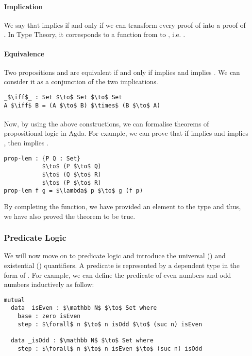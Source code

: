 \paragraph{Implication} We say that  implies  if and only if we can
transform every proof of  into a proof of . In Type
Theory, it corresponds to a function from  to , i.e. . 

\paragraph{Equivalence} Two propositions  and
 are equivalent if and only if  implies  and  implies
. We can consider it as a conjunction of the two implications.
\begin{lstlisting}[mathescape=true,xleftmargin=.3\textwidth]
_$\iff$_ : Set $\to$ Set $\to$ Set
A $\iff$ B = (A $\to$ B) $\times$ (B $\to$ A)
\end{lstlisting} 

\paragraph{} Now, by using the above constructions, we can formalise
 theorems of propositional logic in Agda. For example, we can prove that if  implies  and
 implies , then  implies . 
\begin{lstlisting}[mathescape=true,xleftmargin=.3\textwidth]
prop-lem : {P Q : Set} 
           $\to$ (P $\to$ Q) 
           $\to$ (Q $\to$ R) 
           $\to$ (P $\to$ R)
prop-lem f g = $\lambda$ p $\to$ g (f p)
\end{lstlisting} 

\par By completing the function, we have provided an element
to the type  and thus, we have
also proved the theorem to be true. 


\subsubsection{Predicate Logic} 
\par We will now move on to predicate logic and
introduce the universal (\mb{\forall}) and existential (\mb{\exists})
quantifiers. A predicate is represented by a dependent type in the
form of . For example, we can
define the predicate of even numbers and odd numbers inductively as follow:
\begin{lstlisting}[mathescape=true,xleftmargin=.3\textwidth]
mutual
  data _isEven : $\mathbb N$ $\to$ Set where
    base : zero isEven
    step : $\forall$ n $\to$ n isOdd $\to$ (suc n) isEven

  data _isOdd : $\mathbb N$ $\to$ Set where
    step : $\forall$ n $\to$ n isEven $\to$ (suc n) isOdd
\end{lstlisting} 


